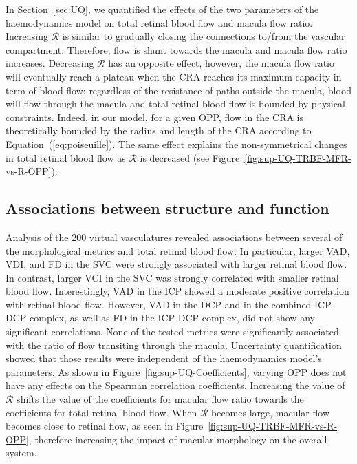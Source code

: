\documentclass[11pt,]{article}
\begin{document}
In Section~\ref{sec:UQ}, we quantified the effects of the two parameters of the haemodynamics model on total retinal blood flow and macula flow ratio.
Increasing $\mathcal R$ is similar to gradually closing the connections to/from the vascular compartment.
Therefore, flow is shunt towards the macula and macula flow ratio increases.
Decreasing $\mathcal R$ has an opposite effect, however, the macula flow ratio will eventually reach a plateau when the CRA reaches its maximum capacity in term of blood flow: regardless of the resistance of paths outside the macula, blood will flow through the macula and total retinal blood flow is bounded by physical constraints.
Indeed, in our model, for a given OPP, flow in the CRA is theoretically bounded by the radius and length of the CRA according to Equation~(\ref{eq:poiseuille}).
The same effect explains the non-symmetrical changes in total retinal blood flow as $\mathcal R$ is decreased (see Figure~\ref{fig:sup-UQ-TRBF-MFR-vs-R-OPP}). 

\subsection{Associations between structure and function}\label{sec:disc-results}

Analysis of the \SI{200}{} virtual vasculatures revealed associations between several of the morphological metrics and total retinal blood flow.
In particular, larger VAD, VDI, and FD in the SVC were strongly associated with larger retinal blood flow.
In contrast, larger VCI in the SVC was strongly correlated with smaller retinal blood flow.
Interestingly, VAD in the ICP showed a moderate positive correlation with retinal blood flow.
However, VAD in the DCP and in the combined ICP-DCP complex, as well as FD in the ICP-DCP complex, did not show any significant correlations.
None of the tested metrics were significantly associated with the ratio of flow transiting through the macula.
Uncertainty quantification showed that those results were independent of the haemodynamics model's parameters.
As shown in Figure~\ref{fig:sup-UQ-Coefficients}, varying OPP does not have any effects on the Spearman correlation coefficients.
Increasing the value of $\mathcal R$ shifts the value of the coefficients for macular flow ratio towards the coefficients for total retinal blood flow.
When $\mathcal R$ becomes large, macular flow becomes close to retinal flow, as seen in Figure~\ref{fig:sup-UQ-TRBF-MFR-vs-R-OPP}, therefore increasing the impact of macular morphology on the overall system. 
\end{document}
